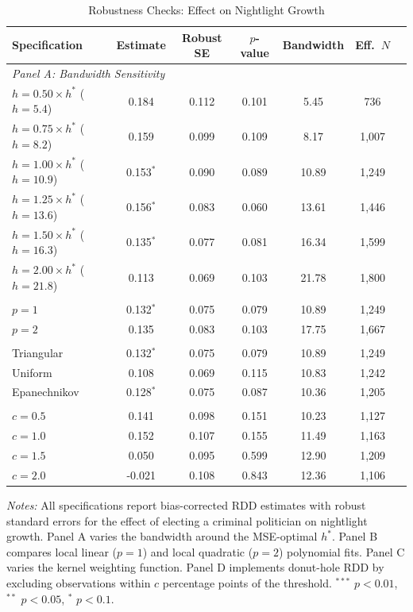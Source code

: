 \begin{table}[htbp]
\centering
\caption{Robustness Checks: Effect on Nightlight Growth}
\label{tab:robustness}
\small
\begin{tabular}{l cccccc}
\toprule
Specification & Estimate & Robust SE & $p$-value & Bandwidth & Eff.\ $N$ \\
\midrule
\multicolumn{6}{l}{\textit{Panel A: Bandwidth Sensitivity}} \\
\addlinespace[3pt]
$h = 0.50 \times h^{*}$ ($h=5.4$) & 0.184 & 0.112 & 0.101 & 5.45 & 736 \\
$h = 0.75 \times h^{*}$ ($h=8.2$) & 0.159 & 0.099 & 0.109 & 8.17 & 1,007 \\
$h = 1.00 \times h^{*}$ ($h=10.9$) & 0.153$^{*}$ & 0.090 & 0.089 & 10.89 & 1,249 \\
$h = 1.25 \times h^{*}$ ($h=13.6$) & 0.156$^{*}$ & 0.083 & 0.060 & 13.61 & 1,446 \\
$h = 1.50 \times h^{*}$ ($h=16.3$) & 0.135$^{*}$ & 0.077 & 0.081 & 16.34 & 1,599 \\
$h = 2.00 \times h^{*}$ ($h=21.8$) & 0.113 & 0.069 & 0.103 & 21.78 & 1,800 \\
\addlinespace[6pt]
\multicolumn{6}{l}{\textit{Panel B: Polynomial Order}} \\
\addlinespace[3pt]
$p = 1$ & 0.132$^{*}$ & 0.075 & 0.079 & 10.89 & 1,249 \\
$p = 2$ & 0.135 & 0.083 & 0.103 & 17.75 & 1,667 \\
\addlinespace[6pt]
\multicolumn{6}{l}{\textit{Panel C: Kernel Function}} \\
\addlinespace[3pt]
Triangular & 0.132$^{*}$ & 0.075 & 0.079 & 10.89 & 1,249 \\
Uniform & 0.108 & 0.069 & 0.115 & 10.83 & 1,242 \\
Epanechnikov & 0.128$^{*}$ & 0.075 & 0.087 & 10.36 & 1,205 \\
\addlinespace[6pt]
\multicolumn{6}{l}{\textit{Panel D: Donut Hole (Excluding $|\text{margin}| < c$)}} \\
\addlinespace[3pt]
$c = 0.5$ & 0.141 & 0.098 & 0.151 & 10.23 & 1,127 \\
$c = 1.0$ & 0.152 & 0.107 & 0.155 & 11.49 & 1,163 \\
$c = 1.5$ & 0.050 & 0.095 & 0.599 & 12.90 & 1,209 \\
$c = 2.0$ & -0.021 & 0.108 & 0.843 & 12.36 & 1,106 \\
\bottomrule
\end{tabular}
\begin{minipage}{0.92\textwidth}
\vspace{4pt}
\footnotesize
\textit{Notes:} All specifications report bias-corrected RDD estimates with robust
standard errors for the effect of electing a criminal politician on nightlight growth.
Panel A varies the bandwidth around the MSE-optimal $h^{*}$.
Panel B compares local linear ($p=1$) and local quadratic ($p=2$) polynomial fits.
Panel C varies the kernel weighting function.
Panel D implements donut-hole RDD by excluding observations within $c$ percentage
points of the threshold.
$^{***}$ $p<0.01$, $^{**}$ $p<0.05$, $^{*}$ $p<0.1$.
\end{minipage}
\end{table}

